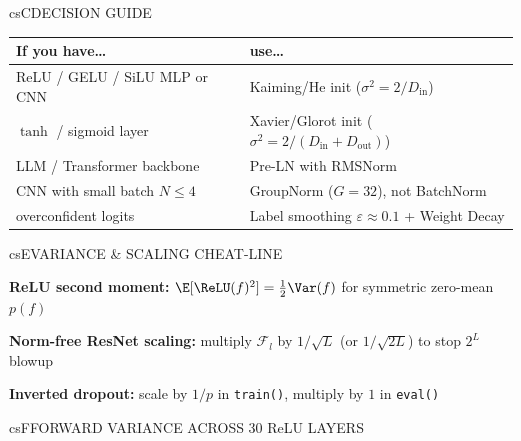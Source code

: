 \documentclass[../../../../master.tex]{subfiles}
\begin{document}
\begin{cscolumns}
\begin{cscard}{csC}{DECISION GUIDE}
  \renewcommand{\arraystretch}{1.22}\small
  \begin{tabular}{@{}>{\raggedright\arraybackslash}p{3.2cm}>{\raggedright\arraybackslash}p{4.6cm}@{}}
    \textbf{If you have\ldots} & \textbf{use\ldots}\\ \hline
    ReLU / GELU / SiLU MLP or CNN & Kaiming/He init ($\sigma^2=2/D_{\text{in}}$)\\
    $\tanh$ / sigmoid layer & Xavier/Glorot init ($\sigma^2=2/(D_{\text{in}}{+}D_{\text{out}})$)\\
    LLM / Transformer backbone & Pre-LN with RMSNorm\\
    CNN with small batch $N\le 4$ & GroupNorm ($G=32$), not BatchNorm\\
    overconfident logits & Label smoothing $\varepsilon\approx 0.1$ + Weight Decay\\
  \end{tabular}
\end{cscard}

\begin{cscard}{csE}{VARIANCE \& SCALING CHEAT-LINE}
  \begin{csbul}
    \item \textbf{ReLU second moment:} $\E[\ReLU(f)^2]=\frac{1}{2}\Var(f)$ for symmetric zero-mean $p(f)$
    \item \textbf{Norm-free ResNet scaling:} multiply $\mathcal{F}_l$ by $1/\sqrt{L}$ (or $1/\sqrt{2L}$) to stop $2^L$ blowup
    \item \textbf{Inverted dropout:} scale by $1/p$ in \texttt{train()}, multiply by $1$ in \texttt{eval()}
  \end{csbul}
\end{cscard}

\begin{cscard}{csF}{FORWARD VARIANCE ACROSS 30 ReLU LAYERS}
  \centering
\end{cscard}
\columnbreak


\end{cscolumns}
\end{document}

